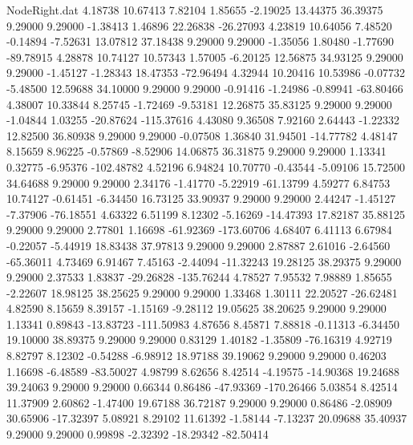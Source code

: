 \begin{filecontents}{NodeRight.dat}
   4.18738   10.67413    7.82104     1.85655   -2.19025   13.44375   36.39375    9.29000    9.29000   -1.38413    1.46896   22.26838  -26.27093
   4.23819   10.64056    7.48520    -0.14894   -7.52631   13.07812   37.18438    9.29000    9.29000   -1.35056    1.80480   -1.77690  -89.78915
   4.28878   10.74127   10.57343     1.57005   -6.20125   12.56875   34.93125    9.29000    9.29000   -1.45127   -1.28343   18.47353  -72.96494
   4.32944   10.20416   10.53986    -0.07732   -5.48500   12.59688   34.10000    9.29000    9.29000   -0.91416   -1.24986   -0.89941  -63.80466
   4.38007   10.33844    8.25745    -1.72469   -9.53181   12.26875   35.83125    9.29000    9.29000   -1.04844    1.03255  -20.87624 -115.37616
   4.43080    9.36508    7.92160     2.64443   -1.22332   12.82500   36.80938    9.29000    9.29000   -0.07508    1.36840   31.94501  -14.77782
   4.48147    8.15659    8.96225    -0.57869   -8.52906   14.06875   36.31875    9.29000    9.29000    1.13341    0.32775   -6.95376 -102.48782
   4.52196    6.94824   10.70770    -0.43544   -5.09106   15.72500   34.64688    9.29000    9.29000    2.34176   -1.41770   -5.22919  -61.13799
   4.59277    6.84753   10.74127    -0.61451   -6.34450   16.73125   33.90937    9.29000    9.29000    2.44247   -1.45127   -7.37906  -76.18551
   4.63322    6.51199    8.12302    -5.16269  -14.47393   17.82187   35.88125    9.29000    9.29000    2.77801    1.16698  -61.92369 -173.60706
   4.68407    6.41113    6.67984    -0.22057   -5.44919   18.83438   37.97813    9.29000    9.29000    2.87887    2.61016   -2.64560  -65.36011
   4.73469    6.91467    7.45163    -2.44094  -11.32243   19.28125   38.29375    9.29000    9.29000    2.37533    1.83837  -29.26828 -135.76244
   4.78527    7.95532    7.98889     1.85655   -2.22607   18.98125   38.25625    9.29000    9.29000    1.33468    1.30111   22.20527  -26.62481
   4.82590    8.15659    8.39157    -1.15169   -9.28112   19.05625   38.20625    9.29000    9.29000    1.13341    0.89843  -13.83723 -111.50983
   4.87656    8.45871    7.88818    -0.11313   -6.34450   19.10000   38.89375    9.29000    9.29000    0.83129    1.40182   -1.35809  -76.16319
   4.92719    8.82797    8.12302    -0.54288   -6.98912   18.97188   39.19062    9.29000    9.29000    0.46203    1.16698   -6.48589  -83.50027
   4.98799    8.62656    8.42514    -4.19575  -14.90368   19.24688   39.24063    9.29000    9.29000    0.66344    0.86486  -47.93369 -170.26466
   5.03854    8.42514   11.37909     2.60862   -1.47400   19.67188   36.72187    9.29000    9.29000    0.86486   -2.08909   30.65906  -17.32397
   5.08921    8.29102   11.61392    -1.58144   -7.13237   20.09688   35.40937    9.29000    9.29000    0.99898   -2.32392  -18.29342  -82.50414

\end{filecontents}
